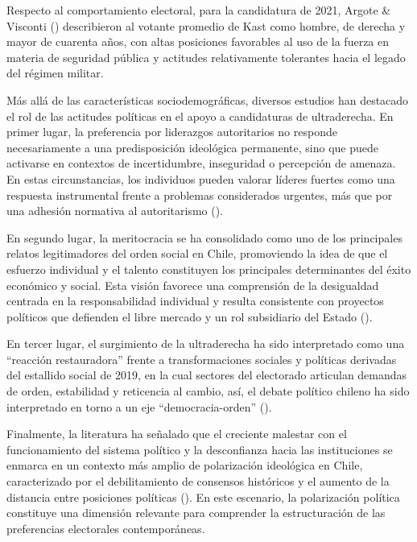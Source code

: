 \documentclass[
  spanish,
  a4paper,
  oneside]{scrbook}
\begin{document}
Respecto al comportamiento electoral, para la candidatura de 2021,
Argote \& Visconti () describieron
al votante promedio de Kast como hombre, de derecha y mayor de cuarenta
años, con altas posiciones favorables al uso de la fuerza en materia de
seguridad pública y actitudes relativamente tolerantes hacia el legado
del régimen militar.

Más allá de las características sociodemográficas, diversos estudios han
destacado el rol de las actitudes políticas en el apoyo a candidaturas
de ultraderecha. En primer lugar, la preferencia por liderazgos
autoritarios no responde necesariamente a una predisposición ideológica
permanente, sino que puede activarse en contextos de incertidumbre,
inseguridad o percepción de amenaza. En estas circunstancias, los
individuos pueden valorar líderes fuertes como una respuesta
instrumental frente a problemas considerados urgentes, más que por una
adhesión normativa al autoritarismo
().

En segundo lugar, la meritocracia se ha consolidado como uno de los
principales relatos legitimadores del orden social en Chile, promoviendo
la idea de que el esfuerzo individual y el talento constituyen los
principales determinantes del éxito económico y social. Esta visión
favorece una comprensión de la desigualdad centrada en la
responsabilidad individual y resulta consistente con proyectos políticos
que defienden el libre mercado y un rol subsidiario del Estado
().

En tercer lugar, el surgimiento de la ultraderecha ha sido interpretado
como una ``reacción restauradora'' frente a transformaciones sociales y
políticas derivadas del estallido social de 2019, en la cual sectores
del electorado articulan demandas de orden, estabilidad y reticencia al
cambio, así, el debate político chileno ha sido interpretado en torno a
un eje ``democracia-orden'' ().

Finalmente, la literatura ha señalado que el creciente malestar con el
funcionamiento del sistema político y la desconfianza hacia las
instituciones se enmarca en un contexto más amplio de polarización
ideológica en Chile, caracterizado por el debilitamiento de consensos
históricos y el aumento de la distancia entre posiciones políticas
(). En este
escenario, la polarización política constituye una dimensión relevante
para comprender la estructuración de las preferencias electorales
contemporáneas.
\end{document}
